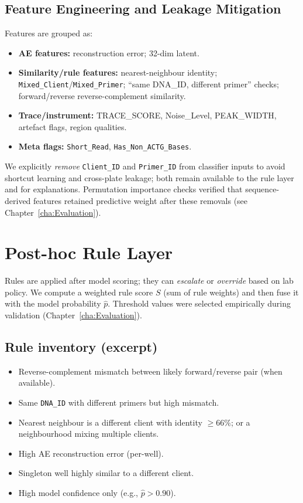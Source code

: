 \subsection{Feature Engineering and Leakage Mitigation}
Features are grouped as:
\begin{itemize}
  \item \textbf{AE features:} reconstruction error; 32-dim latent.
  \item \textbf{Similarity/rule features:} nearest-neighbour identity; \texttt{Mixed\_Client}/\texttt{Mixed\_Primer}; ``same DNA\_ID, different primer'' checks; forward/reverse reverse-complement similarity.
  \item \textbf{Trace/instrument:} TRACE\_SCORE, Noise\_Level, PEAK\_WIDTH, artefact flags, region qualities.
  \item \textbf{Meta flags:} \texttt{Short\_Read}, \texttt{Has\_Non\_ACTG\_Bases}.
\end{itemize}
We explicitly \emph{remove} \texttt{Client\_ID} and \texttt{Primer\_ID} from classifier inputs to avoid shortcut learning and cross-plate leakage; both remain available to the rule layer and for explanations. Permutation importance checks verified that sequence-derived features retained predictive weight after these removals (see Chapter~\ref{cha:Evaluation}).

\section{Post-hoc Rule Layer}
\label{sec:rules}
Rules are applied after model scoring; they can \emph{escalate} or \emph{override} based on lab policy. We compute a weighted rule score $S$ (sum of rule weights) and then fuse it with the model probability $\hat p$. Threshold values were selected empirically during validation (Chapter~\ref{cha:Evaluation}).

\subsection{Rule inventory (excerpt)}
\begin{itemize}
  \item Reverse-complement mismatch between likely forward/reverse pair (when available).
  \item Same \texttt{DNA\_ID} with different primers but high mismatch.
  \item Nearest neighbour is a different client with identity $\geq 66\%$; or a neighbourhood mixing multiple clients.
  \item High AE reconstruction error (per-well).
  \item Singleton well highly similar to a different client.
  \item High model confidence only (e.g., $\hat p > 0.90$).
\end{itemize}


